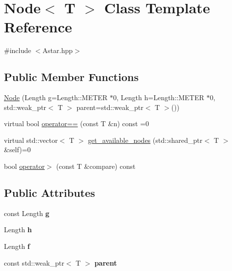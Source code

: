 \hypertarget{class_node}{}\section{Node$<$ T $>$ Class Template Reference}
\label{class_node}


{\ttfamily \#include $<$Astar.\+hpp$>$}

\subsection*{Public Member Functions}
\begin{DoxyCompactItemize}
\item 
\hyperlink{class_node_abb1daa11421a3174e22174bc829f3b96}{Node} (Length g=Length\+::\+M\+E\+T\+ER $\ast$0, Length h=Length\+::\+M\+E\+T\+ER $\ast$0, std\+::weak\+\_\+ptr$<$ T $>$ parent=std\+::weak\+\_\+ptr$<$ T $>$())
\item 
virtual bool \hyperlink{class_node_ab37b3f37bf857e602d19f0c16dee99db}{operator==} (const T \&n) const  =0
\item 
virtual std\+::vector$<$ T $>$ \hyperlink{class_node_a21b3fdcc109b15177bd6cb96d9202b13}{get\+\_\+available\+\_\+nodes} (std\+::shared\+\_\+ptr$<$ T $>$ \&self)=0
\item 
bool \hyperlink{class_node_a72a4ef340b3d732c7eae9ad92a2f0cf2}{operator$>$} (const T \&compare) const 
\end{DoxyCompactItemize}
\subsection*{Public Attributes}
\begin{DoxyCompactItemize}
\item 
const Length {\bfseries g}\hypertarget{class_node_a952609bd42c190ae78ca36c7f8aa022d}{}\label{class_node_a952609bd42c190ae78ca36c7f8aa022d}

\item 
Length {\bfseries h}\hypertarget{class_node_a3e4f962de7f9e113dcbaef80f62d7f1d}{}\label{class_node_a3e4f962de7f9e113dcbaef80f62d7f1d}

\item 
Length {\bfseries f}\hypertarget{class_node_ac989fd6403eed28850d38f65e0566d84}{}\label{class_node_ac989fd6403eed28850d38f65e0566d84}

\item 
const std\+::weak\+\_\+ptr$<$ T $>$ {\bfseries parent}\hypertarget{class_node_a25bfffd0d296e093102d92f9dcc82c4e}{}\label{class_node_a25bfffd0d296e093102d92f9dcc82c4e}

\end{DoxyCompactItemize}


